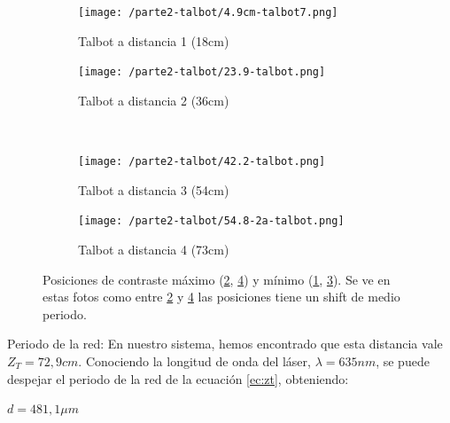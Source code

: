 \documentclass{./packages/optica-article}
\begin{document}
\begin{figure}[hptb]
\begin{center}
    \begin{subfigure}[t]{0.45\textwidth}\centering
        \texttt{[image: /parte2-talbot/4.9cm-talbot7.png]}
        \caption{ Talbot a distancia 1 (18cm)}
        \label{fig:talbot1}	
    \end{subfigure}
	\quad
	\begin{subfigure}[t]{0.45\textwidth}\centering
		\texttt{[image: /parte2-talbot/23.9-talbot.png]}
        \caption{Talbot a distancia 2 (36cm)}
        \label{fig:talbot2}
	\end{subfigure}
	\\
	\begin{subfigure}[t]{0.45\textwidth}\centering
		\texttt{[image: /parte2-talbot/42.2-talbot.png]}
        \caption{ Talbot a distancia 3 (54cm)}
        \label{fig:talbot3}
	\end{subfigure}
	\quad
	\begin{subfigure}[t]{0.45\textwidth}\centering
		\texttt{[image: /parte2-talbot/54.8-2a-talbot.png]}
        \caption{ Talbot a distancia 4 (73cm)}
        \label{fig:talbot4}
	\end{subfigure}
	
\caption{Posiciones de contraste máximo (\ref{fig:talbot2}, \ref{fig:talbot4}) y mínimo (\ref{fig:talbot1}, \ref{fig:talbot3}).
Se ve en estas fotos como entre \ref{fig:talbot2} y \ref{fig:talbot4} las posiciones tiene un shift de medio periodo.}
\label{fig:alltalbot}
\end{center}
\end{figure}

Periodo de la red:
En nuestro sistema, hemos encontrado que esta distancia vale $Z_T = 72,9 cm$. Conociendo la longitud de onda del láser, $\lambda = 635 nm$, se puede despejar el periodo de la red de la ecuación \ref{ec:zt}, obteniendo:
\begin{center}
    $d = 481,1 \mu m$
\end{center}
\end{document}
